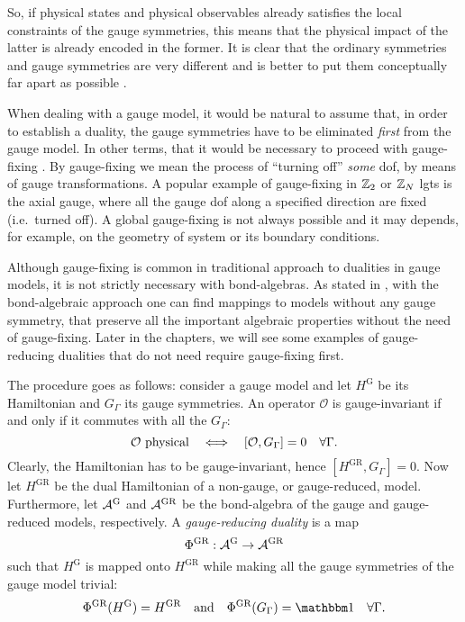 So, if physical states and physical observables already satisfies the local constraints of the gauge symmetries, this means that the physical impact of the latter is already encoded in the former.
It is clear that the ordinary symmetries and gauge symmetries are very different and is better to put them conceptually far apart as possible \cite{cobanera2011bond}.

When dealing with a gauge model, it would be natural to assume that, in order to establish a duality, the gauge symmetries have to be eliminated \emph{first} from the gauge model.
In other terms, that it would be necessary to proceed with gauge-fixing \cite{savit1980duality}.
By gauge-fixing we mean the process of ``turning off'' \emph{some} \ac{dof}, by means of gauge transformations.
A popular example of gauge-fixing in $\mathbb{Z}_2$ or $\mathbb{Z}_N$ \acp{lgt} is the axial gauge, where all the gauge \ac{dof} along a specified direction are fixed \cite{savit1980duality} (i.e.~turned off).
A global gauge-fixing is not always possible and it may depends, for example, on the geometry of system or its boundary conditions.

Although gauge-fixing is common in traditional approach to dualities in gauge models, it is not strictly necessary with bond-algebras.
As stated in \cite{cobanera2011bond}, with the bond-algebraic approach one can find mappings to models without any gauge symmetry, that preserve all the important algebraic properties without the need of gauge-fixing.
Later in the chapters, we will see some examples of gauge-reducing dualities that do not need require gauge-fixing first.

The procedure goes as follows: consider a gauge model and let $H^{\text{G}}$ be its Hamiltonian and $G_{\Gamma}$ its gauge symmetries.
An operator $\mathcal{O}$ is gauge-invariant if and only if it commutes with all the $G_{\Gamma}$:\begin{equation*}
    \mathcal{O} \text{~physical}
    \quad \Longleftrightarrow \quad
    \comm{\mathcal{O}}{G_{\Gamma}} = 0 \quad \forall \Gamma.
\end{equation*}
Clearly, the Hamiltonian has to be gauge-invariant, hence $[H^{\text{GR}}, G_{\Gamma}] = 0$.
Now let $H^{\text{GR}}$ be the dual Hamiltonian of a non-gauge, or gauge-reduced, model.
Furthermore, let $\mathcal{A}^{\text{G}}$ and $\mathcal{A}^{\text{GR}}$ be the bond-algebra of the gauge and gauge-reduced models, respectively.
A \emph{gauge-reducing duality} is a map
\begin{equation*}
    \Phi^{\text{GR}} : \mathcal{A}^{\text{G}} \to \mathcal{A}^{\text{GR}}
\end{equation*}
such that $H^{\text{G}}$ is mapped onto $H^{\text{GR}}$ while making all the gauge symmetries of the gauge model trivial:
\begin{equation}
    \Phi^{\text{GR}}(H^{\text{G}}) = H^{\text{GR}}
    \qand
    \Phi^{\text{GR}}(G_{\Gamma}) = \identity \quad \forall \Gamma.
\end{equation}

